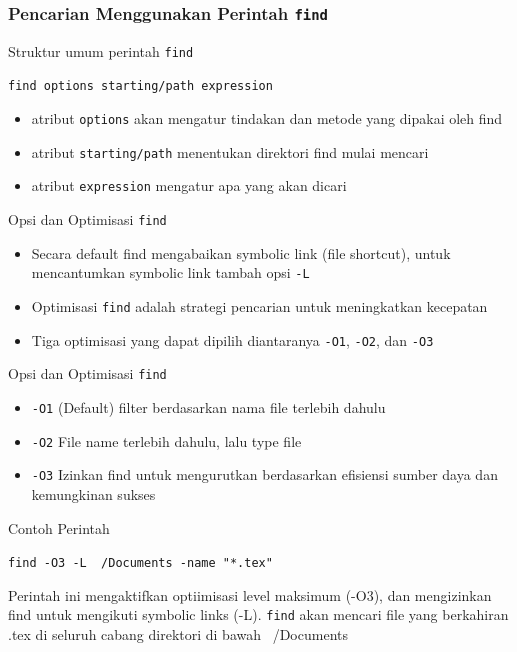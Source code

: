 \documentclass{beamer}
\begin{document}
\begin{frame}
	\frametitle{Pencarian Menggunakan Perintah \texttt{find}}
	Struktur umum perintah \texttt{find}\\
	\begin{tcolorbox}
	\texttt{find options starting/path expression}
	\end{tcolorbox}
\begin{itemize}
	\item atribut \texttt{options} akan mengatur tindakan dan metode  yang dipakai oleh find
	\item atribut \texttt{starting/path} menentukan direktori find mulai mencari
	\item atribut \texttt{expression} mengatur apa yang akan dicari
\end{itemize}
	
\end{frame}

\begin{frame}{Opsi dan Optimisasi \texttt{find}}
	\begin{itemize}
		\item Secara default find mengabaikan symbolic link
		(file shortcut), untuk mencantumkan symbolic link tambah opsi \texttt{-L}
		
		\item Optimisasi \texttt{find} adalah strategi pencarian untuk meningkatkan kecepatan
		
		\item Tiga optimisasi yang dapat dipilih diantaranya \texttt{-O1}, \texttt{-O2}, dan \texttt{-O3}
	\end{itemize}
\end{frame}

\begin{frame}{Opsi dan Optimisasi \texttt{find}}
	\begin{itemize}
		\item \texttt{-O1} (Default) filter berdasarkan nama file terlebih dahulu                                  
		\item \texttt{-O2} File name terlebih dahulu, lalu type file                                               
		\item \texttt{-O3} Izinkan find untuk mengurutkan berdasarkan efisiensi sumber daya dan kemungkinan sukses
	\end{itemize}
\end{frame}

\begin{frame}{Contoh Perintah}
	\begin{tcolorbox}
		\texttt{find -O3 -L ~/Documents -name "*.tex"}
	\end{tcolorbox}
	Perintah ini mengaktifkan optiimisasi level maksimum (-O3), dan mengizinkan find untuk mengikuti symbolic links (-L). \texttt{find} akan mencari file yang berkahiran .tex di seluruh cabang direktori di bawah ~/Documents
\end{frame}
\end{document}
